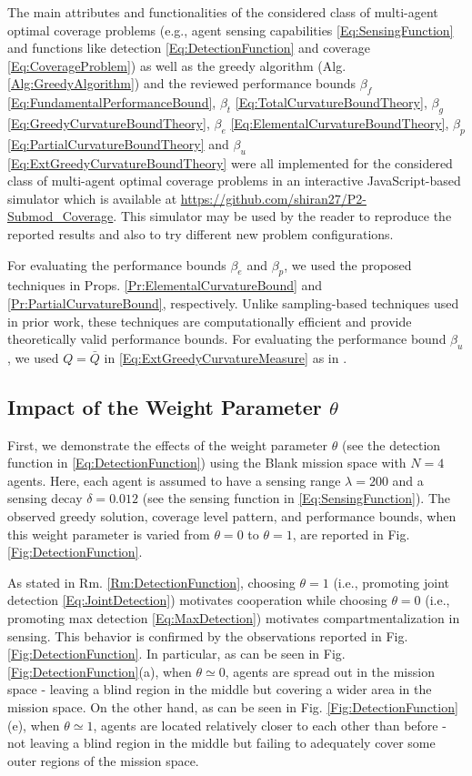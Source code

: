 \documentclass[letterpaper, 10 pt, conference]{ieeeconf}
\begin{document}
The main attributes and functionalities of the considered class of multi-agent optimal coverage problems (e.g., agent sensing capabilities \eqref{Eq:SensingFunction} and functions like detection \eqref{Eq:DetectionFunction} and coverage \eqref{Eq:CoverageProblem}) as well as the greedy algorithm (Alg. \ref{Alg:GreedyAlgorithm}) and the reviewed performance bounds $\beta_f$ \eqref{Eq:FundamentalPerformanceBound}, $\beta_t$ \eqref{Eq:TotalCurvatureBoundTheory}, $\beta_g$ \eqref{Eq:GreedyCurvatureBoundTheory}, $\beta_e$ \eqref{Eq:ElementalCurvatureBoundTheory}, $\beta_p$ \eqref{Eq:PartialCurvatureBoundTheory} and $\beta_u$ \eqref{Eq:ExtGreedyCurvatureBoundTheory} were all implemented for the considered class of multi-agent optimal coverage problems in an interactive JavaScript-based simulator which is available at \url{https://github.com/shiran27/P2-Submod_Coverage}. This simulator may be used by the reader to reproduce the reported results and also to try different new problem configurations. 

For evaluating the performance bounds $\beta_e$ and $\beta_p$, we used the proposed techniques in Props. \ref{Pr:ElementalCurvatureBound} and \ref{Pr:PartialCurvatureBound}, respectively. Unlike sampling-based techniques used in prior work, these techniques are computationally efficient and provide theoretically valid performance bounds. For evaluating the performance bound $\beta_u$, we used $Q=\bar{Q}$ in \eqref{Eq:ExtGreedyCurvatureMeasure} as in \cite{WelikalaJ02021}. 

\subsection{Impact of the Weight Parameter $\theta$}

First, we demonstrate the effects of the weight parameter $\theta$ (see the detection function in \eqref{Eq:DetectionFunction}) using the Blank mission space with $N=4$ agents. Here, each agent is assumed to have a sensing range $\lambda = 200$ and a sensing decay $\delta = 0.012$ (see the sensing function in \eqref{Eq:SensingFunction}). The observed greedy solution, coverage level pattern, and performance bounds, when this weight parameter is varied from $\theta = 0$ to $\theta=1$, are reported in Fig. \ref{Fig:DetectionFunction}. 

As stated in Rm. \ref{Rm:DetectionFunction}, choosing $\theta=1$ (i.e., promoting joint detection \eqref{Eq:JointDetection}) motivates cooperation while choosing $\theta=0$ (i.e., promoting max detection \eqref{Eq:MaxDetection}) motivates compartmentalization in sensing. This behavior is confirmed by the observations reported in Fig. \ref{Fig:DetectionFunction}. 
In particular, as can be seen in Fig. \ref{Fig:DetectionFunction}(a), when $\theta \simeq 0$, agents are spread out in the mission space - leaving a blind region in the middle but covering a wider area in the mission space. On the other hand, as can be seen in Fig. \ref{Fig:DetectionFunction}(e), when $\theta \simeq 1$, agents are located relatively closer to each other than before - not leaving a blind region in the middle but failing to adequately cover some outer regions of the mission space. 
\end{document}
